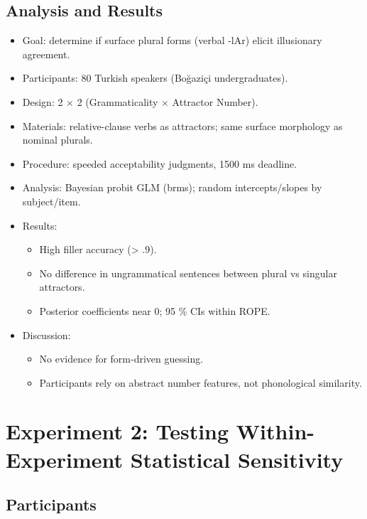 \documentclass[
  authoryear,
  preprint]{elsarticle}
\providecommand{\tightlist}{%
  \setlength{\itemsep}{0pt}\setlength{\parskip}{0pt}}
\begin{document}
\subsection{Analysis and Results}\label{analysis-and-results}

\begin{itemize}
\tightlist
\item
  Goal: determine if surface plural forms (verbal -lAr) elicit
  illusionary agreement.
\item
  Participants: 80 Turkish speakers (Boğaziçi undergraduates).
\item
  Design: 2 × 2 (Grammaticality × Attractor Number).
\item
  Materials: relative-clause verbs as attractors; same surface
  morphology as nominal plurals.
\item
  Procedure: speeded acceptability judgments, 1500 ms deadline.
\item
  Analysis: Bayesian probit GLM (brms); random intercepts/slopes by
  subject/item.
\item
  Results:

  \begin{itemize}
  \tightlist
  \item
    High filler accuracy (\textgreater{} .9).
  \item
    No difference in ungrammatical sentences between plural vs singular
    attractors.
  \item
    Posterior coefficients near 0; 95 \% CIs within ROPE.
  \end{itemize}
\item
  Discussion:

  \begin{itemize}
  \tightlist
  \item
    No evidence for form-driven guessing.
  \item
    Participants rely on abstract number features, not phonological
    similarity.
  \end{itemize}
\end{itemize}

\section{Experiment 2: Testing Within-Experiment Statistical
Sensitivity}\label{experiment-2-testing-within-experiment-statistical-sensitivity}

\subsection{Participants}\label{participants-1}
\end{document}
